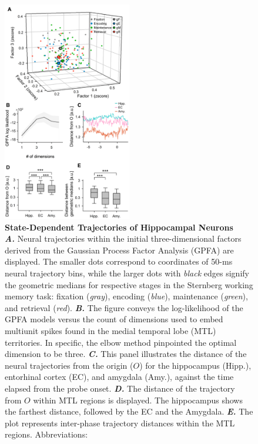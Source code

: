 \documentclass[final,3p,times,twocolumn]{elsarticle}
\begin{document}
        \clearpage
        \begin{figure}[ht]
        	\centering
            \includegraphics[width=0.5\textwidth]{./src/figures/.png/Figure_ID_02.png}
        	\caption{\textbf{
State-Dependent Trajectories of Hippocampal Neurons
}
\smallskip
\\
\textbf{\textit{A.}} Neural trajectories within the initial three-dimensional factors derived from the Gaussian Process Factor Analysis (GPFA) are displayed. The smaller dots correspond to coordinates of 50-ms neural trajectory bins, while the larger dots with \textit{black} edges signify the geometric medians for respective stages in the Sternberg working memory task: fixation (\textit{gray}), encoding (\textit{blue}), maintenance (\textit{green}), and retrieval (\textit{red}). \textbf{\textit{B.}} The figure conveys the log-likelihood of the GPFA models versus the count of dimensions used to embed multiunit spikes found in the medial temporal lobe (MTL) territories. In specific, the elbow method pinpointed the optimal dimension to be three. \textbf{\textit{C.}} This panel illustrates the distance of the neural trajectories from the origin ($O$) for the hippocampus (Hipp.), entorhinal cortex (EC), and amygdala (Amy.), against the time elapsed from the probe onset. \textbf{\textit{D.}} The distance of the trajectory from $O$ within MTL regions is displayed. The hippocampus shows the farthest distance, followed by the EC and the Amygdala. \textbf{\textit{E.}} The plot represents inter-phase trajectory distances within the MTL regions.
Abbreviations:
}
        	\label{fig:02}
        \end{figure}
\end{document}
